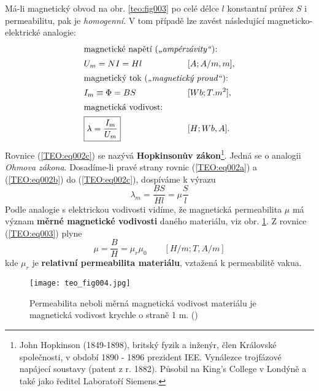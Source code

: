 {      Má-li magnetický obvod na obr. \ref{teo:fig003} po celé délce \(l\) konstantní průřez \(S\) i 
      permeabilitu, pak je \emph{homogenní}. V tom případě lze zavést následující 
      magneticko-elektrické analogie:
      \begin{alignat}{3}
       \shortintertext{magnetické napětí (\emph{\uv{ampérzávity}}):}
        & U_m = NI = Hl        \quad && \text{ } \qquad
           && [A; A/m, m],  \label{TEO:eq002a}  \\
        \shortintertext{magnetický tok (\emph{\uv{magnetický proud}}):} 
        & I_m\equiv\Phi = BS \quad && \text{ } \qquad 
           && [Wb; T. m^2], \label{TEO:eq002b}  \\
        \shortintertext{magnetická vodivost:}
        & \boxed{\lambda = \frac{I_m}{U_m}} \quad && \text{ } \qquad 
           && [H; Wb, A].   \label{TEO:eq002c} 
      \end{alignat}
      Rovnice (\ref{TEO:eq002c}) se nazývá \textbf{Hopkinsonův  zákon}\footnote{John Hopkinson 
      (\num{1849}-\num{1898}), britský fyzik a inženýr, člen Královské společnosti, v období 1890 - 
      1896 prezident IEE. Vynálezce trojfázové napájecí soustavy (patent z r. 1882). Působil na 
      King's College v Londýně a také jako ředitel Laboratoří Siemens.}. Jedná se o analogii 
      \emph{Ohmova zákona}. Dosadíme-li pravé strany rovnic (\ref{TEO:eq002a}) a (\ref{TEO:eq002b}) 
      do (\ref{TEO:eq002c}), dospíváme k výrazu
      \begin{equation}  \label{TEO:eq003}
        \lambda_m = \frac{BS}{Hl} = \mu\frac{S}{l}
      \end{equation}
      Podle analogie s elektrickou vodivosti vidíme, že magnetická permeabilita \(\mu\) má význam 
      \textbf{měrné magnetické vodivosti} daného materiálu, viz obr. \ref{teo:fig004}. Z rovnice 
      (\ref{TEO:eq003}) plyne
      \begin{equation}  \label{TEO:eq004}
        \boxed{\mu = \frac{B}{H} = \mu_r\mu_0} \qquad [H/m; T, A/m]
      \end{equation}
      kde \(\mu_r\) je \textbf{relativní permeabilita materiálu}, vztažená k permeabilitě vakua.
      \begin{figure}[ht!] %
        \centering
        \texttt{[image: teo\_fig004.jpg]}
        \caption{Permeabilita neboli měrná magnetická vodivost materiálu je magnetická vodivost 
                 krychle o straně 1 m.
                 (\cite[s.~152]{Patocka4})}
        \label{teo:fig004}
      \end{figure}

}

